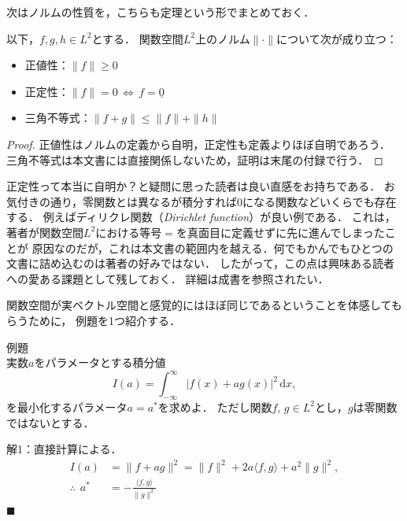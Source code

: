 次はノルムの性質を，こちらも定理という形でまとめておく．

\begin{theorem}
以下，$f, g, h \in L^2$とする．
関数空間$L^2$上のノルム$\| \cdot \|$について次が成り立つ：
\begin{itemize}
    \item 正値性：$\| f \| \geq 0$
    \item 正定性：$\| f \| = 0 \, \Longleftrightarrow \, f = \underline{0}$
    \item 三角不等式：$\| f + g \| \leq \| f \| + \| h \|$
\end{itemize}
\end{theorem}
\begin{proof}
正値性はノルムの定義から自明，正定性も定義よりほぼ自明であろう．
三角不等式は本文書には直接関係しないため，証明は末尾の付録で行う．
\end{proof}

\begin{note}
正定性って本当に自明か？と疑問に思った読者は良い直感をお持ちである．
お気付きの通り，零関数とは異なるが積分すれば0になる関数などいくらでも存在する．
例えばディリクレ関数（\textit{Dirichlet function}）が良い例である．
これは，著者が関数空間$L^2$における等号$=$を真面目に定義せずに先に進んでしまったことが
原因なのだが，これは本文書の範囲内を越える．何でもかんでもひとつの文書に詰め込むのは著者の好みではない．
したがって，この点は興味ある読者への愛ある課題として残しておく．
詳細は成書を参照されたい．
\end{note}

関数空間が実ベクトル空間と感覚的にはほぼ同じであるということを体感してもらうために，
例題を1つ紹介する．

\noindent\textsf{例題}\\
実数$a$をパラメータとする積分値
\begin{equation}
I(a) = \int_{-\infty}^{\infty} \bigl| f(x) + a g(x) \bigr|^2 \, \mathrm{d}x,
\end{equation}
を最小化するパラメータ$a = a^*$を求めよ．
ただし関数$f$, $g \in L^2$とし，$g$は零関数ではないとする．

\noindent\textsf{解1}：直接計算による．
\begin{align*}
I(a) &= \| f + a g \|^2 = \| f \|^2 + 2 a \langle f, g \rangle + a^2 \| g \|^2, \\
\therefore \hspace{5pt} a^* &= - \frac{\langle f, g \rangle}{\| g \|^2}
\end{align*}
\hfill$\blacksquare$

